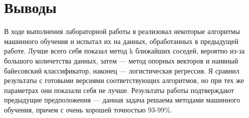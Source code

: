 \section{Выводы}

В ходе выполнения лабораторной работы я реализовал некоторые алгоритмы машинного обучения и испытал их на данных, обработанных в предыдущей работе. Лучше всего себя показал метод k ближайших соседей, вероятно из-за большого количетства данных, затем --- метод опорных векторов и наивный байесовский классификатор, наконец --- логистическая регрессия. Я сравнил результаты с готовыми версиями соответствующих алгоритмов, но при тех же параметрах они показали себя не лучше. Результаты работы подтверждают предыдущие предположения --- данная задача решаема методами машинного обучения, причем с очень хорошей точностью 93-99\%.
\pagebreak
